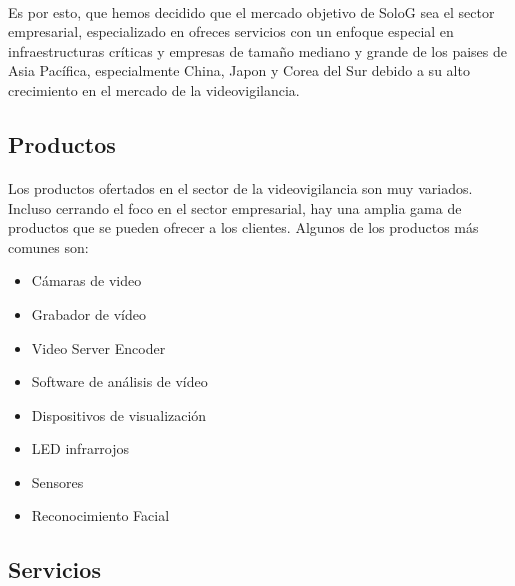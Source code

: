 \documentclass{report}
\begin{document}
        \paragraph{}{
          Es por esto, que hemos decidido que el mercado objetivo de SoloG sea el sector empresarial, especializado en ofreces servicios con un enfoque especial en infraestructuras críticas y empresas de tamaño mediano y grande de los paises de Asia Pacífica, especialmente China, Japon y Corea del Sur debido a su alto crecimiento en el mercado de la videovigilancia.
        }
        \subsection{Productos}
          \paragraph*{}
          {
            Los productos ofertados en el sector de la videovigilancia son muy variados.
            Incluso cerrando el foco en el sector empresarial, hay una amplia gama de productos que se pueden ofrecer a los clientes.
            Algunos de los productos más comunes son: \cite{wiki-videovigilancia-ip}
          }
          \begin{multicols}{2}
            \begin{itemize}
              \item Cámaras de video
              \item Grabador de vídeo 
              \item Video Server Encoder
              \item Software de análisis de vídeo
              \item Dispositivos de visualización
              \item LED infrarrojos
              \item Sensores
              \item Reconocimiento Facial
            \end{itemize}
          \end{multicols}
        \subsection{Servicios}
\end{document}
